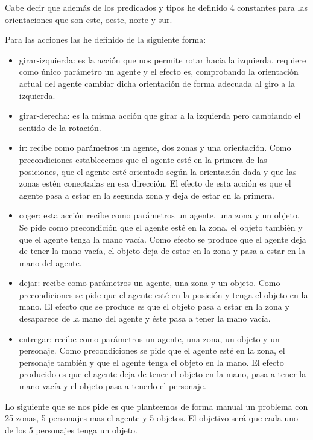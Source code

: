 \documentclass[12pt,a4paper]{article}
\begin{document}
Cabe decir que además de los predicados y tipos he definido 4 constantes para las orientaciones que son este, oeste, norte y sur.

Para las acciones las he definido de la siguiente forma:

\begin{itemize}
	\item girar-izquierda: es la acción que nos permite rotar hacia la izquierda, requiere como único parámetro un agente y el efecto es, comprobando la orientación actual del agente cambiar dicha orientación de forma adecuada al giro a la izquierda.
	\item girar-derecha: es la misma acción que girar a la izquierda pero cambiando el sentido de la rotación.
	\item ir: recibe como parámetros un agente, dos zonas y una orientación. Como precondiciones establecemos que el agente esté en la primera de las posiciones, que el agente esté orientado según la orientación dada y que las zonas estén conectadas en esa dirección. El efecto de esta acción es que el agente pasa a estar en la segunda zona y deja de estar en la primera.
	\item coger: esta acción recibe como parámetros un agente, una zona y un objeto. Se pide como precondición que el agente esté en la zona, el objeto también y que el agente tenga la mano vacía. Como efecto se produce que el agente deja de tener la mano vacía, el objeto deja de estar en la zona y pasa a estar en la mano del agente.
	\item dejar: recibe como parámetros un agente, una zona y un objeto. Como precondiciones se pide que el agente esté en la posición y tenga el objeto en la mano. El efecto que se produce es que el objeto pasa a estar en la zona y desaparece de la mano del agente y éste pasa a tener la mano vacía.
	\item entregar: recibe como parámetros un agente, una zona, un objeto y un personaje. Como precondiciones se pide que el agente esté en la zona, el personaje también y que el agente tenga el objeto en la mano. El efecto producido es que el agente deja de tener el objeto en la mano, pasa a tener la mano vacía y el objeto pasa a tenerlo el personaje.
\end{itemize}

Lo siguiente que se nos pide es que planteemos de forma manual un problema con 25 zonas, 5 personajes mas el agente y 5 objetos. El objetivo será que cada uno de los 5 personajes tenga un objeto.
\end{document}
